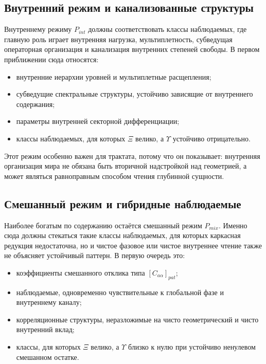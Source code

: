 \documentclass[12pt,a4paper]{article}
\begin{document}
\subsection{Внутренний режим и канализованные структуры}

Внутреннему режиму \(P_{int}\) должны соответствовать классы наблюдаемых, где главную роль играет внутренняя нагрузка, мультиплетность, субведущая операторная организация и канализация внутренних степеней свободы. В первом приближении сюда относятся:
\begin{itemize}
    \item внутренние иерархии уровней и мультиплетные расщепления;
    \item субведущие спектральные структуры, устойчиво зависящие от внутреннего содержания;
    \item параметры внутренней секторной дифференциации;
    \item классы наблюдаемых, для которых \(\Xi\) велико, а \(\Upsilon\) устойчиво отрицательно.
\end{itemize}

Этот режим особенно важен для трактата, потому что он показывает: внутренняя организация мира не обязана быть вторичной надстройкой над геометрией, а может являться равноправным способом чтения глубинной сущности.

\subsection{Смешанный режим и гибридные наблюдаемые}

Наиболее богатым по содержанию остаётся смешанный режим \(P_{mix}\). Именно сюда должны стекаться такие классы наблюдаемых, для которых каркасная редукция недостаточна, но и чистое фазовое или чистое внутреннее чтение также не объясняет устойчивый паттерн. В первую очередь это:
\begin{itemize}
    \item коэффициенты смешанного отклика типа \([C_{a\alpha}]_{pat}\);
    \item наблюдаемые, одновременно чувствительные к глобальной фазе и внутреннему каналу;
    \item корреляционные структуры, неразложимые на чисто геометрический и чисто внутренний вклад;
    \item классы, для которых \(\Xi\) велико, а \(\Upsilon\) близко к нулю при устойчиво ненулевом смешанном остатке.
\end{itemize}
\end{document}
